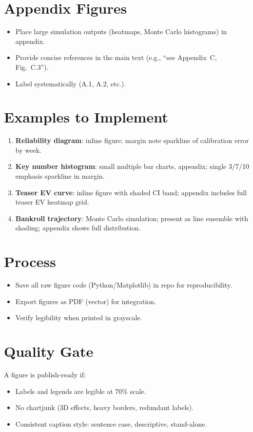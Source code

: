 \section{Appendix Figures}
\begin{itemize}
  \item Place large simulation outputs (heatmaps, Monte Carlo histograms) in appendix.
  \item Provide concise references in the main text (e.g., ``see Appendix~C, Fig.~C.3'').
  \item Label systematically (A.1, A.2, etc.).
\end{itemize}

\section{Examples to Implement}
\begin{enumerate}
  \item \textbf{Reliability diagram}: inline figure; margin note sparkline of calibration error by week.
  \item \textbf{Key number histogram}: small multiple bar charts, appendix; single 3/7/10 emphasis sparkline in margin.
  \item \textbf{Teaser EV curve}: inline figure with shaded CI band; appendix includes full teaser EV heatmap grid.
  \item \textbf{Bankroll trajectory}: Monte Carlo simulation; present as line ensemble with shading; appendix shows full distribution.
\end{enumerate}

\section{Process}
\begin{itemize}
  \item Save all raw figure code (Python/Matplotlib) in repo for reproducibility.
  \item Export figures as PDF (vector) for integration.
  \item Verify legibility when printed in grayscale.
\end{itemize}

\section{Quality Gate}
A figure is publish-ready if:
\begin{itemize}
  \item Labels and legends are legible at 70\% scale.
  \item No chartjunk (3D effects, heavy borders, redundant labels).
  \item Consistent caption style: sentence case, descriptive, stand-alone.
\end{itemize}

